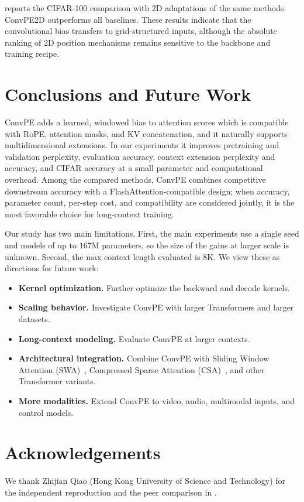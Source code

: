 \documentclass{article}
\begin{document}
 reports the CIFAR-100 comparison with 2D adaptations of the same methods. ConvPE2D outperforms all baselines. These results indicate that the convolutional bias transfers to grid-structured inputs, although the absolute ranking of 2D position mechanisms remains sensitive to the backbone and training recipe.

\section{Conclusions and Future Work}
\label{sec:conclusion}

ConvPE adds a learned, windowed bias to attention scores which is compatible with RoPE, attention masks, and KV concatenation, and it naturally supports multidimensional extensions. In our experiments it improves pretraining and validation perplexity, evaluation accuracy, context extension perplexity and accuracy, and CIFAR accuracy at a small parameter and computational overhead. Among the compared methods, ConvPE combines competitive downstream accuracy with a FlashAttention-compatible design; when accuracy, parameter count, per-step cost, and compatibility are considered jointly, it is the most favorable choice for long-context training.

Our study has two main limitations. First, the main experiments use a single seed and models of up to $167$M parameters, so the size of the gains at larger scale is unknown. Second, the max context length evaluated is 8K. We view these as directions for future work:

\begin{itemize}
    \item \textbf{Kernel optimization.} Further optimize the backward and decode kernels.
    \item \textbf{Scaling behavior.} Investigate ConvPE with larger Transformers and larger datasets.
    \item \textbf{Long-context modeling.} Evaluate ConvPE at larger contexts.
    \item \textbf{Architectural integration.} Combine ConvPE with Sliding Window Attention (SWA)~\cite{beltagy2020longformer}, Compressed Sparse Attention (CSA)~\cite{deepseek2026v4}, and other Transformer variants.
    \item \textbf{More modalities.} Extend ConvPE to video, audio, multimodal inputs, and control models.
\end{itemize}

\section*{Acknowledgements}

We thank Zhijian Qiao (Hong Kong University of Science and Technology) for the independent reproduction and the peer comparison in .



\end{document}
